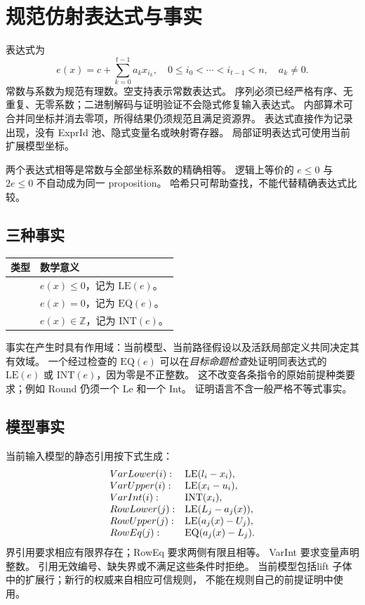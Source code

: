 \section{规范仿射表达式与事实}
\label{sec:canonical-affine}

表达式为
\[
 e(x)=c+\sum_{k=0}^{t-1}a_kx_{i_k},\quad
 0\le i_0<\cdots<i_{t-1}<n,\quad a_k\ne0.
\]
常数与系数为规范有理数。空支持表示常数表达式。
序列必须已经严格有序、无重复、无零系数；二进制解码与证明验证不会隐式修复输入表达式。
内部算术可合并同坐标并消去零项，所得结果仍须规范且满足资源界。
表达式直接作为记录出现，没有 ExprId 池、隐式变量名或映射寄存器。
局部证明表达式可使用当前扩展模型坐标。

两个表达式相等是常数与全部坐标系数的精确相等。
逻辑上等价的 $e\le0$ 与 $2e\le0$ 不自动成为同一 proposition。
哈希只可帮助查找，不能代替精确表达式比较。

\subsection{三种事实}
\label{sec:fact-kinds}

\begin{center}
\begin{tabularx}{\textwidth}{lY}
\toprule
类型 & 数学意义 \\
\midrule
{} & $e(x)\le0$，记为 $\mathrm{LE}(e)$。\\
 & $e(x)=0$，记为 $\mathrm{EQ}(e)$。\\
 & $e(x)\in\mathbb Z$，记为 $\mathrm{INT}(e)$。\\
\bottomrule
\end{tabularx}
\end{center}

事实在产生时具有作用域：当前模型、当前路径假设以及活跃局部定义共同决定其有效域。
一个经过检查的 $\mathrm{EQ}(e)$ 可以在\emph{目标命题检查}处证明同表达式的
$\mathrm{LE}(e)$ 或 $\mathrm{INT}(e)$，因为零是不正整数。
这不改变各条指令的原始前提种类要求；例如 Round 仍须一个 Le 和一个 Int。
证明语言不含一般严格不等式事实。

\subsection{模型事实}
\label{sec:static-model-facts}

当前输入模型的静态引用按下式生成：
\[
\begin{array}{ll}
 VarLower(i):&\mathrm{LE}(l_i-x_i),\\
 VarUpper(i):&\mathrm{LE}(x_i-u_i),\\
 VarInt(i):&\mathrm{INT}(x_i),\\
 RowLower(j):&\mathrm{LE}(L_j-a_j(x)),\\
 RowUpper(j):&\mathrm{LE}(a_j(x)-U_j),\\
 RowEq(j):&\mathrm{EQ}(a_j(x)-L_j).
\end{array}
\]
界引用要求相应有限界存在；RowEq 要求两侧有限且相等。
VarInt 要求变量声明整数。
引用无效编号、缺失界或不满足这些条件时拒绝。
当前模型包括lift 子体中的扩展行；新行的权威来自相应可信规则，
不能在规则自己的前提证明中使用。


